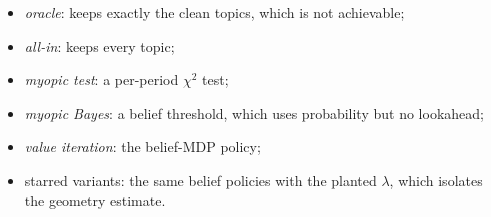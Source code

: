 \documentclass[11pt]{article}
\theoremstyle{definition}
\theoremstyle{remark}
\begin{document}
\begin{itemize}
  \begin{itemize}
    \item \emph{oracle}: keeps exactly the clean topics, which is not achievable;
    \item \emph{all-in}: keeps every topic;
    \item \emph{myopic test}: a per-period $\chi^2$ test;
    \item \emph{myopic Bayes}: a belief threshold, which uses probability but no lookahead;
    \item \emph{value iteration}: the belief-MDP policy;
    \item starred variants: the same belief policies with the planted $\lambda$, which isolates the geometry estimate.
  \end{itemize}
\end{itemize}

\begin{table}[!htbp]\centering\small
{}
\caption{Reward per period on test streams (standard errors $0.2$--$2.6$; all-in scores $-28$ to $-5$). $^*$ uses the planted noncentrality. Every policy except all-in keeps the region glued in every period.}\label{tab:rewardloop}
\end{table}
\end{document}
